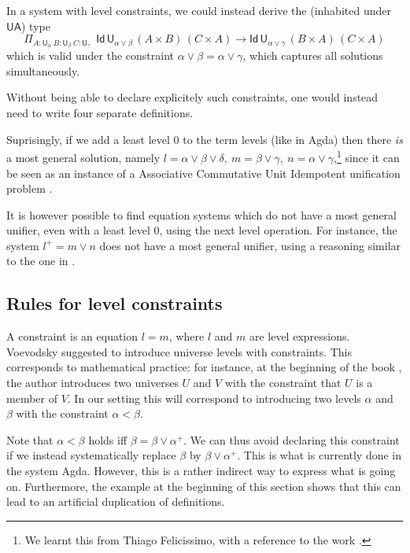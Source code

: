 \documentclass[11pt,a4paper]{article}
\theoremstyle{definition}
\newcommand{\Id}{\mathsf{Id}}
\newcommand{\UU}{\mathsf{U}}
\newcommand{\UA}{\mathsf{UA}}
\begin{document}

In a system with level constraints,
we could instead derive the (inhabited under $\UA$) type
$$
    \Pi_{A:\UU_\alpha~{B}:{\UU_\beta}~{C}:{\UU_\gamma}}
    {~~\Id\,\UU_{\alpha \vee \beta}\, (A\times B)\,(C \times A)
    \to \Id\,\UU_{\alpha \vee \gamma}\, (B\times A)\,(C \times A)}
$$
which is valid under the constraint
$\alpha \vee \beta = \alpha \vee \gamma$,
which captures all solutions simultaneously.

Without being able to declare explicitely such constraints, %
one would instead need to write four separate definitions.

 Suprisingly, if we add a least level $0$ to the term levels (like in Agda) then there \emph{is} a most general solution,
 namely $l = \alpha\vee\beta\vee\delta,~m = \beta\vee\gamma,~n = \alpha\vee\gamma$,\footnote{We learnt this from
 Thiago Felicissimo, with a reference to the work \cite{FBB:impred2pred}.}
 since it can be seen as an instance of
 a Associative Commutative Unit Idempotent unification problem \cite{BaaderS94}.

 It is however possible to find equation systems which do not have a most general unifier, even with a least level $0$, using
 the next level operation. For instance, the system $l^+ = m\vee n$ does not have a most general unifier, using a reasoning
 similar to the one in \cite{FBB:impred2pred}.

\subsection*{Rules for level constraints}%

A constraint is an equation $l = m$, where $l$ and $m$ are level expressions.
Voevodsky \cite{VV} suggested to introduce universe levels with
constraints. This corresponds to mathematical practice:
for instance, at the beginning of the book \cite{giraud:cohom-non-abel},
the author introduces two universes $U$ and $V$ with the constraint
that $U$ is a member of $V$.
In our setting this will correspond to introducing two levels
$\alpha$ and $\beta$ with the constraint $\alpha<\beta$.

Note that $\alpha < \beta$ holds iff $\beta = \beta \vee\alpha^+$.
We can thus avoid declaring this constraint if we instead
systematically replace $\beta$ by $\beta\vee\alpha^+$.
This is what is currently done in the system Agda.
However, this is a rather indirect way to express what is
going on. Furthermore, the example at the beginning of this section
shows that this can lead to an artificial duplication of definitions.
\end{document}
